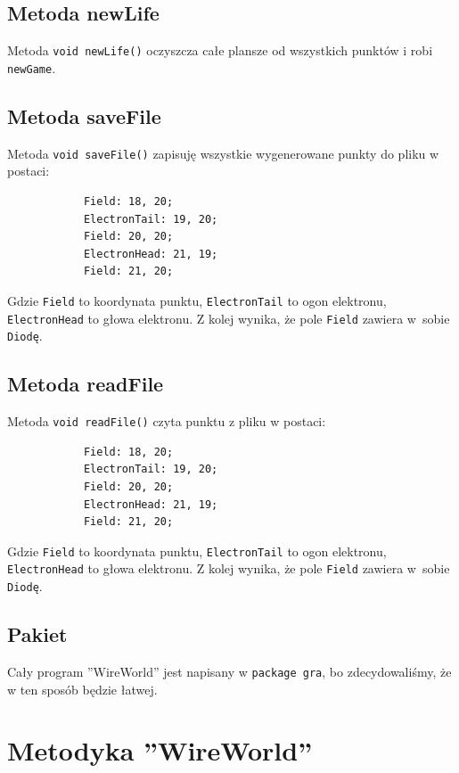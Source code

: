 \documentclass[a4paper, 12pt]{article}
\begin{document}
		\subsection{Metoda newLife}
			\hspace*{0,9cm} Metoda \texttt{void newLife()} oczyszcza całe plansze od wszystkich punktów i robi \texttt{newGame}.
		
		\subsection{Metoda saveFile}
			\hspace*{1cm} Metoda \texttt{void saveFile()} zapisuję wszystkie wygenerowane punkty do pliku w postaci: 
		\begin{verbatim}
			Field: 18, 20;
			ElectronTail: 19, 20;
			Field: 20, 20;
			ElectronHead: 21, 19;
			Field: 21, 20;
 		\end{verbatim}
 			\vspace{-0,8cm}
 			\hspace*{1cm} Gdzie \texttt{Field} to koordynata punktu, \texttt{ElectronTail} to ogon elektronu, \texttt{ElectronHead} to głowa elektronu. Z kolej wynika, że pole \texttt{Field} zawiera w~sobie \texttt{Diodę}.
		\subsection{Metoda readFile}
			\hspace*{1cm} Metoda \texttt{void readFile()} czyta punktu z pliku w postaci: 
		\begin{verbatim}
			Field: 18, 20;
			ElectronTail: 19, 20;
			Field: 20, 20;
			ElectronHead: 21, 19;
			Field: 21, 20;
 		\end{verbatim}
 			\vspace{-0,8cm}
 			\hspace*{1cm} Gdzie \texttt{Field} to koordynata punktu, \texttt{ElectronTail} to ogon elektronu, \texttt{ElectronHead} to głowa elektronu. Z kolej wynika, że pole \texttt{Field} zawiera w~sobie \texttt{Diodę}.
			
		\subsection{Pakiet}
			\hspace*{1cm} Cały program ''WireWorld'' jest napisany w \texttt{package gra}, bo zdecydowaliśmy, że w ten sposób będzie łatwej.
\newpage
	\section{Metodyka ''WireWorld''}
\end{document}
